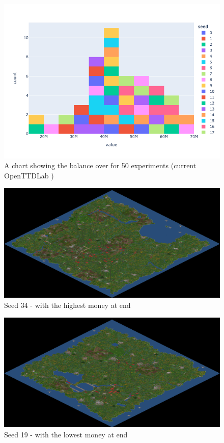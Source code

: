 \documentclass[logo,msc,dsti]{infthesis}    %
\begin{document}
\begin{figure}[h]
\centering
\includegraphics[width=\columnwidth]{assets/end-of-30th-year-distribution.png}
\caption{A chart showing the balance over for 50 experiments (current OpenTTDLab )}
\label{fig:first-year}
\end{figure}

\begin{figure}[h]
\centering
\includegraphics[width=\columnwidth]{assets/34_small.png}
\caption{Seed 34 - with the highest money at end}
\label{fig:openttd}
\end{figure}

\begin{figure}[h]
\centering
\includegraphics[width=\columnwidth]{assets/19_small.png}
\caption{Seed 19 - with the lowest money at end}
\label{fig:openttd}
\end{figure}
\end{document}
